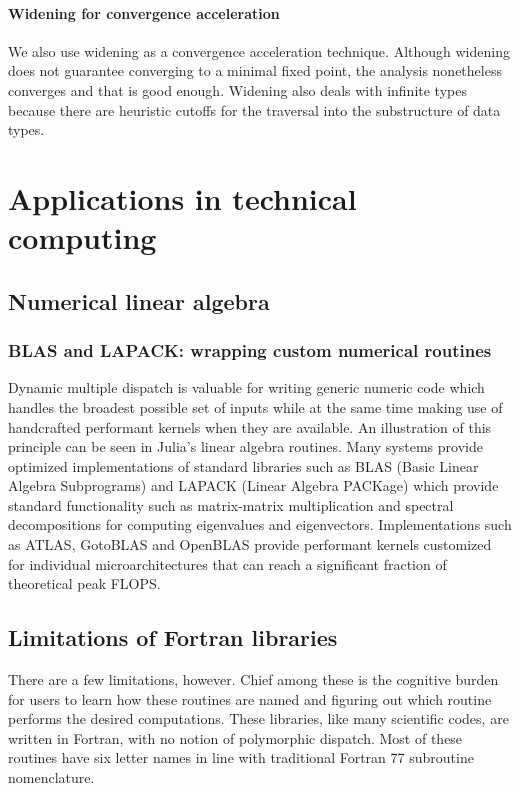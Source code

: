 \documentclass[pldi]{sigplanconf-pldi15}
\begin{document}
\paragraph{Widening for convergence acceleration}
We also use widening as a convergence acceleration technique. Although widening
does not guarantee converging to a minimal fixed point, the analysis
nonetheless converges and that is good enough.  Widening also deals with
infinite types because there are heuristic cutoffs for the traversal into the
substructure of data types.



\section{Applications in technical computing}


\subsection{Numerical linear algebra}

\subsubsection{BLAS and LAPACK: wrapping custom numerical routines}

Dynamic multiple dispatch is valuable for writing generic numeric code which
handles the broadest possible set of inputs while at the same time making use
of handcrafted performant kernels when they are available.  An illustration of
this principle can be seen in Julia's linear algebra routines.  Many systems
provide optimized implementations of standard libraries such as BLAS (Basic
Linear Algebra Subprograms) and LAPACK (Linear Algebra PACKage) which provide
standard functionality such as matrix-matrix multiplication and spectral
decompositions for computing eigenvalues and eigenvectors.  Implementations
such as ATLAS, GotoBLAS and OpenBLAS provide performant kernels customized for
individual microarchitectures that can reach a significant fraction of
theoretical peak FLOPS.

\subsection{Limitations of Fortran libraries}
There are a few limitations, however.  Chief among these is the cognitive
burden for users to learn how these routines are named and figuring out which
routine performs the desired computations.  These libraries, like many
scientific codes, are written in Fortran, with no notion of polymorphic
dispatch.  Most of these routines have six letter names in line with
traditional Fortran 77 subroutine nomenclature.
\end{document}
